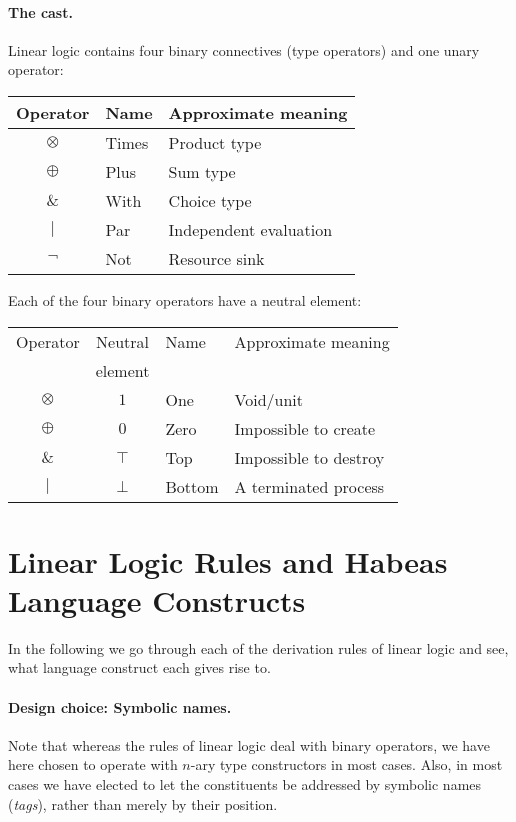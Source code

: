 \documentclass[a4paper]{article}
\begin{document}
\paragraph{The cast.} Linear logic contains four binary connectives (type operators) and
one unary operator:
\begin{center}
  \begin{tabular}{c|l|l}
    \hline
    \hline
    Operator & Name & Approximate meaning\\
    \hline
    $\otimes$ & Times & Product type\\
    $\oplus$  & Plus  & Sum type\\
    $\&$      & With  & Choice type\\
    $|$       & Par   & Independent evaluation\\
    \hline
    $\lnot$   & Not   & Resource sink\\
    \hline
  \end{tabular}
\end{center}

Each of the four binary operators have a neutral element:
\begin{center}
  \begin{tabular}{c|c|l|l}
    \hline
    \hline
    Operator & Neutral & Name & Approximate meaning\\
             & element &&\\
    \hline
    $\otimes$ & $1$    & One    & Void/unit\\
    $\oplus$  & $0$    & Zero   & Impossible to create\\
    $\&$      & $\top$ & Top    & Impossible to destroy\\
    $|$       & $\bot$ & Bottom & A terminated process\\
    \hline
  \end{tabular}
\end{center}


\section{Linear Logic Rules and Habeas Language Constructs}

In the following we go through each of the derivation rules of linear
logic and see, what language construct each gives rise to.

\paragraph{Design choice: Symbolic names.}
Note that whereas the rules of linear logic deal with binary
operators, we have here chosen to operate with $n$-ary type
constructors in most cases.  Also, in most cases we have elected to
let the constituents be addressed by symbolic names (\emph{tags}),
rather than merely by their position.
\end{document}
